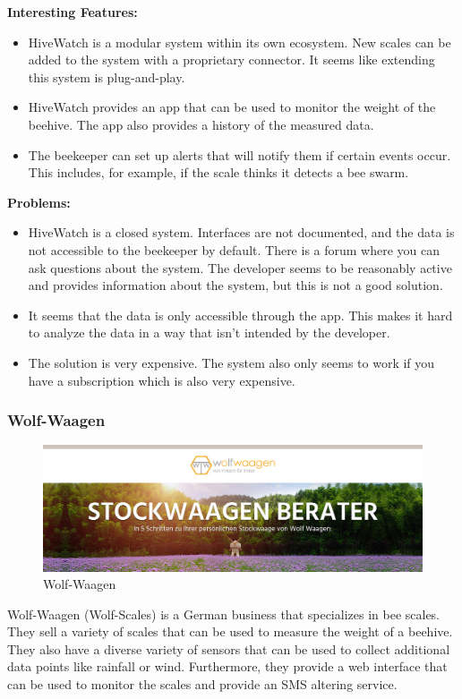 \newpage
\textbf{Interesting Features:}
\begin{itemize}
    \item HiveWatch is a modular system within its own ecosystem. New scales can be added to the system with a proprietary connector. It seems like extending this system is plug-and-play.
    \item HiveWatch provides an app that can be used to monitor the weight of the beehive. The app also provides a history of the measured data.
    \item The beekeeper can set up alerts that will notify them if certain events occur. This includes, for example, if the scale thinks it detects a bee swarm.
\end{itemize}
\textbf{Problems:}
\begin{itemize}
    \item HiveWatch is a closed system. Interfaces are not documented, and the data is not accessible to the beekeeper by default. There is a forum where you can ask questions about the system. The developer seems to be reasonably active and provides information about the system, but this is not a good solution.
    \item It seems that the data is only accessible through the app. This makes it hard to analyze the data in a way that isn't intended by the developer.
    \item The solution is very expensive. The system also only seems to work if you have a subscription which is also very expensive.
\end{itemize}
\newpage

\subsubsection{Wolf-Waagen}

\begin{figure}
    \centering
    \includegraphics[width=1\textwidth]{figures/wolf_waagen_logo.jpg}
    \caption{Wolf-Waagen}
    \label{fig:wolf_waagen}
\end{figure}
Wolf-Waagen (Wolf-Scales) is a German business that specializes in bee scales. They sell a variety of scales that can be used to measure the weight of a beehive. They also have a diverse variety of sensors that can be used to collect additional data points like rainfall or wind. Furthermore, they provide a web interface that can be used to monitor the scales and provide an SMS altering service.

